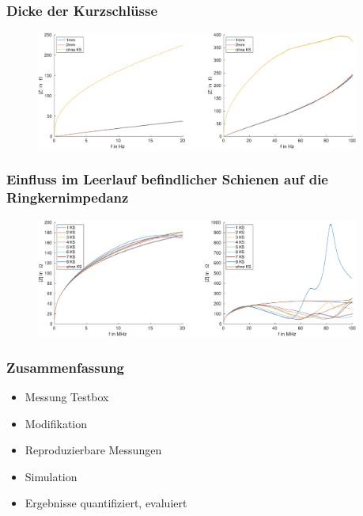 \documentclass[accentcolor=tud9b, colorbacktitle, inverttitle]{tudbeamer}
\begin{document}



\begin{frame}\frametitle{Dicke der Kurzschlüsse}
\vspace{-1em}
\begin{figure}[h]
	\centering
	\includegraphics[width=0.95\textwidth]{Z_RK_thick_1KS}
\end{figure}
\end{frame}



\begin{frame}\frametitle{Einfluss im Leerlauf befindlicher Schienen auf die Ringkernimpedanz}
\vspace{-1em}
\begin{figure}[h]
	\centering
	\includegraphics[width=0.95\textwidth]{Z_RK_numKS_open}
\end{figure}
\end{frame}

\begin{frame}\frametitle{Zusammenfassung}
\begin{itemize}
	\item Messung Testbox
	\item Modifikation 
	\item Reproduzierbare Messungen
	\item Simulation
	\item Ergebnisse quantifiziert, evaluiert
\end{itemize}
\end{frame}
\end{document}
